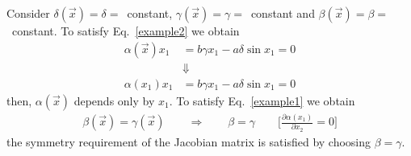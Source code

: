 \documentclass[12pt,a4paper,oneside]{book}
\begin{document}
\begin{onehalfspace}
\begin{example}
	Consider $\delta(\vec{x})=\delta=$~constant, 
	$\gamma(\vec{x})=\gamma=$~constant and $\beta(\vec{x})=\beta=$~constant. To 
	satisfy Eq.~\eqref{example2} we obtain
	\begin{equation*}
		\begin{aligned}
			\alpha(\vec{x})x_1 &=b\gamma x_1-a\delta \sin x_1=0 \\[6pt]
			&\Downarrow \\[6pt]
			\alpha(x_1)x_1 &=b\gamma x_1-a\delta \sin x_1=0
		\end{aligned}
	\end{equation*}
	then, $\alpha(\vec{x})$ depends only by $x_1$. To satisfy 
	Eq.~\eqref{example1} we obtain
	\begin{equation*}
		\begin{aligned}
			\beta(\vec{x})=\gamma(\vec{x}) \qquad\Rightarrow\qquad\beta=\gamma 
			\qquad\Big[\frac{\partial\alpha(x_1)}{\partial x_2}=0\Big]
		\end{aligned}
	\end{equation*}
	the symmetry requirement of the Jacobian matrix is satisfied by choosing 
	$\beta=\gamma$.
	

\end{example}
\end{onehalfspace}
\end{document}

